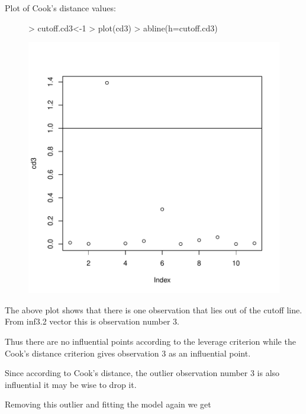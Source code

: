 \documentclass[12pt]{article}
\begin{document}
\begin{itemize}
Plot of Cook's distance values:
\begin{figure}[H]
\begin{Schunk}
\begin{Sinput}
> cutoff.cd3<-1
> plot(cd3)
> abline(h=cutoff.cd3)
\end{Sinput}
\end{Schunk}
\includegraphics{HW6-025}
\end{figure}
The above plot shows that there is one observation that lies out of the cutoff line. From inf3.2 vector this is observation number 3.

Thus there are no influential points according to the leverage criterion while the Cook's distance criterion gives observation 3 as an influential point.

Since according to Cook's distance, the outlier observation number 3 is also influential it may be wise to drop it.   

Removing this outlier and fitting the model again we get


\end{itemize}
\end{document}
